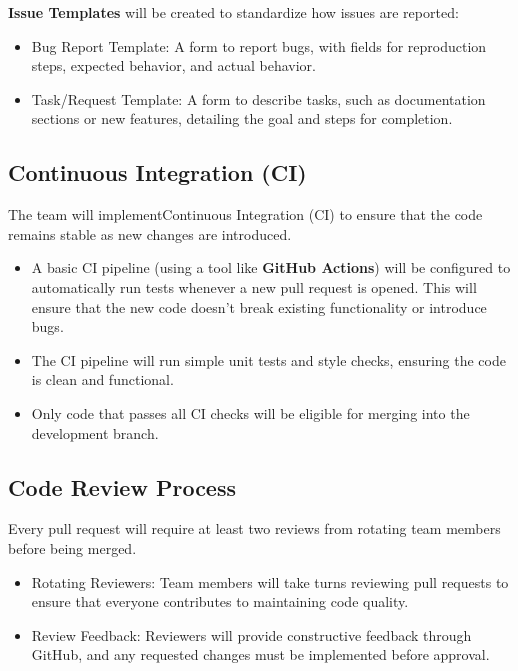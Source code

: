 \documentclass{article}
\begin{document}
\textbf{Issue Templates} will be created to standardize how issues are reported:
\begin{itemize}
    \item Bug Report Template: A form to report bugs, with fields for reproduction steps, expected behavior, and actual behavior.
    \item Task/Request Template: A form to describe tasks, such as documentation sections or new features, detailing the goal and steps for completion.
\end{itemize}

\subsection{Continuous Integration (CI)}
The team will implementContinuous Integration (CI) to ensure that the code remains stable as new changes are introduced.
\begin{itemize}
    \item A basic CI pipeline (using a tool like \textbf{GitHub Actions}) will be configured to automatically run tests whenever a new pull request is opened. This will ensure that the new code doesn’t break existing functionality or introduce bugs.
    \item The CI pipeline will run simple unit tests and style checks, ensuring the code is clean and functional.
    \item Only code that passes all CI checks will be eligible for merging into the development branch.
\end{itemize}

\subsection{Code Review Process}
Every pull request will require at least two reviews from rotating team members before being merged.
\begin{itemize}
    \item Rotating Reviewers: Team members will take turns reviewing pull requests to ensure that everyone contributes to maintaining code quality.
    \item Review Feedback: Reviewers will provide constructive feedback through GitHub, and any requested changes must be implemented before approval.
\end{itemize}
\end{document}
